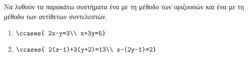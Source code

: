Να λυθούν τα παρακάτω συστήματα ένα με τη μέθοδο των οριζουσών και ένα με τη μέθοδο των αντίθετων συντελεστών.
\begin{multicols}{2}
\begin{enumerate}[label=\roman*.,itemsep=0mm]
\item $\ccases{
2x-y=3\\
x+3y=5}$
\item $\ccases{
2(x-1)+3(y+2)=13\\
x-(2y-1)=2}$
\end{enumerate}\end{multicols}
